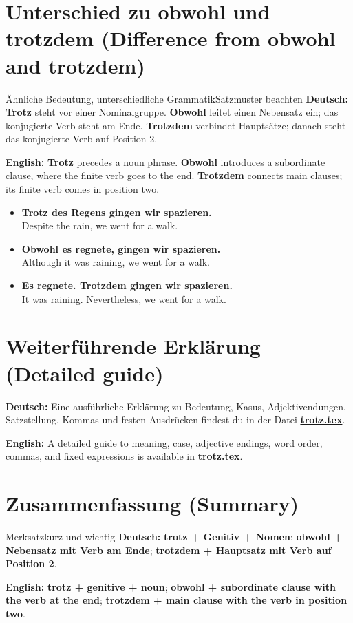 \documentclass[a4paper,11pt]{article}
\newcommand{\GermanText}[1]{\textbf{Deutsch: }#1\par}
\newcommand{\EnglishText}[1]{{\small\color{SoftGray}\textbf{English: }#1\par}}
\newcommand{\ExampleItem}[2]{\item \textbf{#1}\\{\small\color{SoftGray}#2}}
\begin{document}
\section{Unterschied zu \glqq obwohl\grqq{} und \glqq trotzdem\grqq{} \textnormal{(Difference from \glqq obwohl\grqq{} and \glqq trotzdem\grqq)}}
\begin{grammarentry}{Ähnliche Bedeutung, unterschiedliche Grammatik}{Satzmuster beachten}
\GermanText{\textbf{Trotz} steht vor einer Nominalgruppe. \textbf{Obwohl} leitet einen Nebensatz ein; das konjugierte Verb steht am Ende. \textbf{Trotzdem} verbindet Hauptsätze; danach steht das konjugierte Verb auf Position 2.}
\EnglishText{\textbf{Trotz} precedes a noun phrase. \textbf{Obwohl} introduces a subordinate clause, where the finite verb goes to the end. \textbf{Trotzdem} connects main clauses; its finite verb comes in position two.}
\end{grammarentry}
\begin{exbox}
\begin{itemize}
\ExampleItem{Trotz des Regens gingen wir spazieren.}{Despite the rain, we went for a walk.}
\ExampleItem{Obwohl es regnete, gingen wir spazieren.}{Although it was raining, we went for a walk.}
\ExampleItem{Es regnete. Trotzdem gingen wir spazieren.}{It was raining. Nevertheless, we went for a walk.}
\end{itemize}
\end{exbox}

\section{Weiterführende Erklärung \textnormal{(Detailed guide)}}
\GermanText{Eine ausführliche Erklärung zu Bedeutung, Kasus, Adjektivendungen, Satzstellung, Kommas und festen Ausdrücken findest du in der Datei \href{https://github.com/donkarlo/nd_german_learning_project/blob/main/src/part/grammar/part/praeposition/kind/konzessiv/trotz/trotz.tex}{\textbf{trotz.tex}}.}
\EnglishText{A detailed guide to meaning, case, adjective endings, word order, commas, and fixed expressions is available in \href{https://github.com/donkarlo/nd_german_learning_project/blob/main/src/part/grammar/part/praeposition/kind/konzessiv/trotz/trotz.tex}{\textbf{trotz.tex}}.}

\section{Zusammenfassung \textnormal{(Summary)}}
\begin{grammarentry}{Merksatz}{kurz und wichtig}
\GermanText{\textbf{trotz + Genitiv + Nomen}; \textbf{obwohl + Nebensatz mit Verb am Ende}; \textbf{trotzdem + Hauptsatz mit Verb auf Position 2}.}
\EnglishText{\textbf{trotz + genitive + noun}; \textbf{obwohl + subordinate clause with the verb at the end}; \textbf{trotzdem + main clause with the verb in position two}.}
\end{grammarentry}
\end{document}
